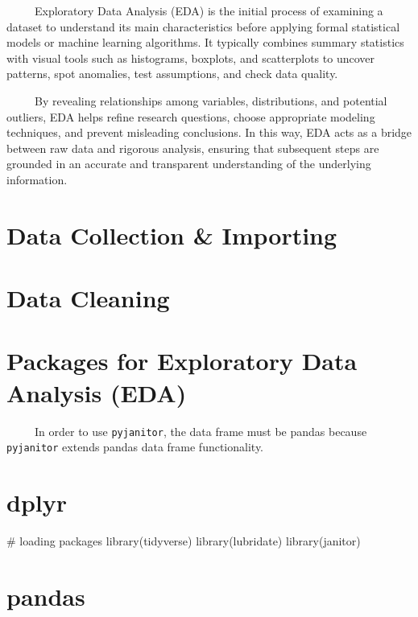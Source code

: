\documentclass[
  letterpaper,
  DIV=11,
  numbers=noendperiod]{scrreprt}
\newenvironment{Shaded}{\begin{snugshade}}{\end{snugshade}}
\newcommand{\CommentTok}[1]{\textcolor[rgb]{0.37,0.37,0.37}{#1}}
\newcommand{\FunctionTok}[1]{\textcolor[rgb]{0.28,0.35,0.67}{#1}}
\newcommand{\NormalTok}[1]{\textcolor[rgb]{0.00,0.23,0.31}{#1}}
\begin{document}
~~~~~Exploratory Data Analysis (EDA) is the initial process of examining
a dataset to understand its main characteristics before applying formal
statistical models or machine learning algorithms. It typically combines
summary statistics with visual tools such as histograms, boxplots, and
scatterplots to uncover patterns, spot anomalies, test assumptions, and
check data quality.

~~~~~By revealing relationships among variables, distributions, and
potential outliers, EDA helps refine research questions, choose
appropriate modeling techniques, and prevent misleading conclusions. In
this way, EDA acts as a bridge between raw data and rigorous analysis,
ensuring that subsequent steps are grounded in an accurate and
transparent understanding of the underlying information.

\section{Data Collection \& Importing}\label{data-collection-importing}

\section{Data Cleaning}\label{data-cleaning}

\section{Packages for Exploratory Data Analysis
(EDA)}\label{packages-for-exploratory-data-analysis-eda}

~~~~~In order to use \texttt{pyjanitor}, the data frame must be pandas
because \texttt{pyjanitor} extends pandas data frame functionality.

\section{dplyr}

\begin{Shaded}
\begin{Highlighting}[]
\CommentTok{\# loading packages}
\FunctionTok{library}\NormalTok{(tidyverse)}
\FunctionTok{library}\NormalTok{(lubridate)}
\FunctionTok{library}\NormalTok{(janitor)}
\end{Highlighting}
\end{Shaded}

\section{pandas}
\end{document}
